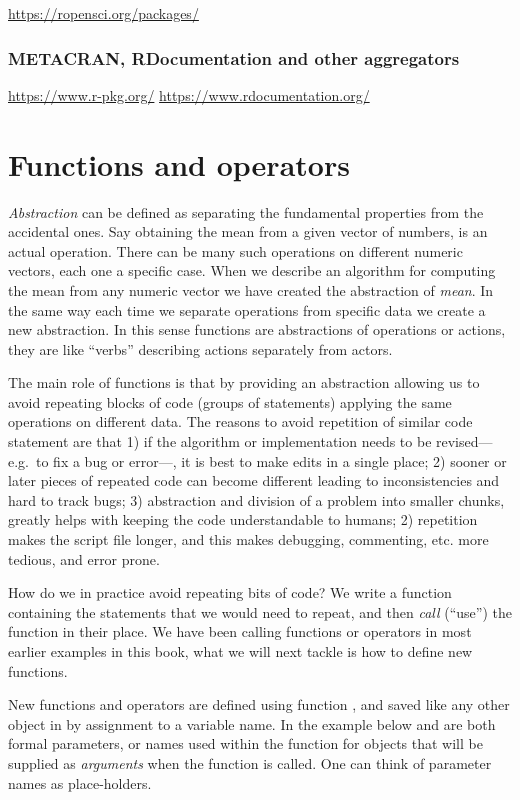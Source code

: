 \documentclass[krantz2]{krantz}\usepackage{knitr}%
\begin{document}
\url{https://ropensci.org/packages/}

\subsubsection{METACRAN, RDocumentation and other aggregators}

\url{https://www.r-pkg.org/}
\url{https://www.rdocumentation.org/}

\section{Functions and operators}\label{sec:script:functions}

\emph{Abstraction} can be defined as separating the fundamental properties from the accidental ones. Say obtaining the mean from a given vector of numbers, is an actual operation. There can be many such operations on different numeric vectors, each one a specific case. When we describe an algorithm for computing the mean from any numeric vector we have created the abstraction of \emph{mean}. In the same way each time we separate operations from specific data we create a new abstraction. In this sense functions are abstractions of operations or actions, they are like ``verbs'' describing actions separately from actors.

The main role of functions is that by providing an abstraction allowing us to avoid repeating blocks of code (groups of statements) applying the same operations on different data. The reasons to avoid repetition of similar code statement are that 1) if the algorithm or implementation needs to be revised---e.g.\ to fix a bug or error---, it is best to make edits in a single place; 2) sooner or later pieces of repeated code can become different leading to inconsistencies and hard to track bugs; 3) abstraction and division of a problem into smaller chunks, greatly helps with keeping the code understandable to humans; 2) repetition makes the script file longer, and this makes debugging, commenting, etc. more tedious, and error prone.

How do we in practice avoid repeating bits of code? We write a function containing the statements that we would need to repeat, and then \emph{call} (``use'') the function in their place. We have been calling \Rlang functions or operators in most earlier examples in this book, what we will next tackle is how to define new functions.

New functions and operators are defined using function , and saved like any other object in \Rpgrm by assignment to a variable name. In the example below  and  are both formal parameters, or names used within the function for objects that will be supplied as \emph{arguments} when the function is called. One can think of parameter names as place-holders.
\end{document}
